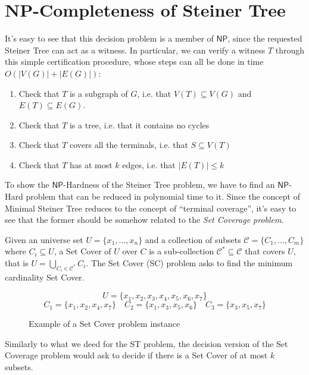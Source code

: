 \documentclass[12pt,a4paper]{article}
\newcommand{\curlyquotes}[1]{\textquotedblleft #1\textquotedblright}
\newcommand{\abs}[1]{\left|#1\right|}
\begin{document}
    \section{\textsf{NP}-Completeness of Steiner Tree}

    It's easy to see that this decision problem is a member of $\mathsf{NP}$, since the requested Steiner Tree can act as a witness. In particular, we can verify a witness $T$ through this simple certification procedure, whose steps can all be done in time $O(\abs{V(G)} + \abs{E(G)})$:
    \begin{enumerate}
        \item Check that $T$ is a subgraph of $G$, i.e. that $V(T) \subseteq V(G)$ and $E(T) \subseteq E(G)$.
        \item Check that $T$ is a tree, i.e. that it contains no cycles
        \item Check that $T$ covers all the terminals, i.e. that $S \subseteq V(T)$
        \item Check that $T$ has at most $k$ edges, i.e. that $\abs{E(T)} \leq k$
    \end{enumerate}

    To show the $\mathsf{NP}$-Hardness of the Steiner Tree problem, we have to find an $\mathsf{NP}$-Hard problem that can be reduced in polynomial time to it. Since the concept of Minimal Steiner Tree reduces to the concept of \curlyquotes{terminal coverage}, it's easy to see that the former should be somehow related to the \textit{Set Coverage problem}.

    Given an universe set $U = \{x_1, \ldots, x_n\}$ and a collection of subsets $\mathcal{C} = \{C_1, \ldots, C_m\}$ where $C_i \subseteq U$, a Set Cover of $U$ over $C$ is a sub-collection $\mathcal{C}^* \subseteq \mathcal{C}$ that covers $U$, that is $U = \bigcup_{C_i \in \mathcal{C}^*} C_i$. The Set Cover (SC) problem asks to find the minimum cardinality Set Cover.

    \begin{figure}[H]
        \[U = \{x_1, x_2, x_3, x_4, x_5, x_6, x_7\}\]
        \[C_1 = \{x_1, x_2, x_4, x_7\} \quad C_2 = \{x_1, x_3, x_5, x_6\} \quad C_3 = \{x_3, x_5, x_7\}\]

        \caption{Example of a Set Cover problem instance}
    \end{figure}
    
    Similarly to what we deed for the ST problem, the decision version of the Set Coverage problem would ask to decide if there is a Set Cover of at most $k$ subsets.
\end{document}
